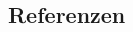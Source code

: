 \documentclass[paper=a1,parskip=half,fontsize=24]{scrartcl}
\begin{document}
  \begin{multicols*}{3}
  
    
    
    
    
    
    
    
    \section*{Referenzen}
    \vspace*{0.3cm}
    \nocite{*}
    \printbibliography[heading=none]

  \end{multicols*}
\end{document}
